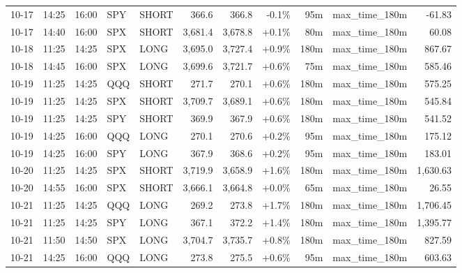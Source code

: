 \documentclass[11pt,a4paper,twoside]{article}
\begin{document}
\begin{center}
\begin{longtable}{>{\color{txtmain}}l l l l l r r r r >{\color{txtmain}}l r}
10-17 & 14:25 & 16:00 & SPY & SHORT & 366.6 & 366.8 & \textcolor{lossred}{-0.1\%} & 95m & max\_time\_180m & \textcolor{lossred}{-61.83} \\
10-17 & 14:40 & 16:00 & SPX & SHORT & 3,681.4 & 3,678.8 & \textcolor{wingreen}{+0.1\%} & 80m & max\_time\_180m & \textcolor{wingreen}{60.08} \\
10-18 & 11:25 & 14:25 & SPX & LONG & 3,695.0 & 3,727.4 & \textcolor{wingreen}{+0.9\%} & 180m & max\_time\_180m & \textcolor{wingreen}{867.67} \\
10-18 & 14:45 & 16:00 & SPX & LONG & 3,699.6 & 3,721.7 & \textcolor{wingreen}{+0.6\%} & 75m & max\_time\_180m & \textcolor{wingreen}{585.46} \\
10-19 & 11:25 & 14:25 & QQQ & SHORT & 271.7 & 270.1 & \textcolor{wingreen}{+0.6\%} & 180m & max\_time\_180m & \textcolor{wingreen}{575.25} \\
10-19 & 11:25 & 14:25 & SPX & SHORT & 3,709.7 & 3,689.1 & \textcolor{wingreen}{+0.6\%} & 180m & max\_time\_180m & \textcolor{wingreen}{545.84} \\
10-19 & 11:25 & 14:25 & SPY & SHORT & 369.9 & 367.9 & \textcolor{wingreen}{+0.6\%} & 180m & max\_time\_180m & \textcolor{wingreen}{541.52} \\
10-19 & 14:25 & 16:00 & QQQ & LONG & 270.1 & 270.6 & \textcolor{wingreen}{+0.2\%} & 95m & max\_time\_180m & \textcolor{wingreen}{175.12} \\
10-19 & 14:25 & 16:00 & SPY & LONG & 367.9 & 368.6 & \textcolor{wingreen}{+0.2\%} & 95m & max\_time\_180m & \textcolor{wingreen}{183.01} \\
10-20 & 11:25 & 14:25 & SPX & SHORT & 3,719.9 & 3,658.9 & \textcolor{wingreen}{+1.6\%} & 180m & max\_time\_180m & \textcolor{wingreen}{1,630.63} \\
10-20 & 14:55 & 16:00 & SPX & SHORT & 3,666.1 & 3,664.8 & \textcolor{wingreen}{+0.0\%} & 65m & max\_time\_180m & \textcolor{wingreen}{26.55} \\
10-21 & 11:25 & 14:25 & QQQ & LONG & 269.2 & 273.8 & \textcolor{wingreen}{+1.7\%} & 180m & max\_time\_180m & \textcolor{wingreen}{1,706.45} \\
10-21 & 11:25 & 14:25 & SPY & LONG & 367.1 & 372.2 & \textcolor{wingreen}{+1.4\%} & 180m & max\_time\_180m & \textcolor{wingreen}{1,395.77} \\
10-21 & 11:50 & 14:50 & SPX & LONG & 3,704.7 & 3,735.7 & \textcolor{wingreen}{+0.8\%} & 180m & max\_time\_180m & \textcolor{wingreen}{827.59} \\
10-21 & 14:25 & 16:00 & QQQ & LONG & 273.8 & 275.5 & \textcolor{wingreen}{+0.6\%} & 95m & max\_time\_180m & \textcolor{wingreen}{603.63} \\

\end{longtable}
\end{center}
\end{document}
